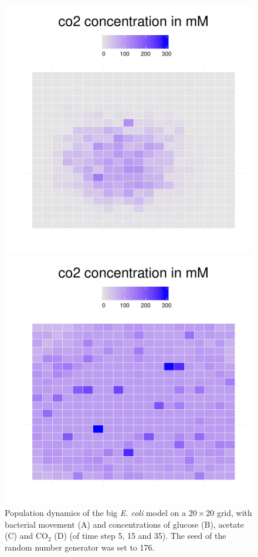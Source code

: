 \begin{figure}[h!]
{\begin{minipage}[t]{0.3\textwidth}
  \end{minipage}
  \begin{minipage}[t]{0.3\textwidth}
    \includegraphics[width=\textwidth]{../results/Bcoli_20x20_seed176_co215.pdf}
  \end{minipage}
  \begin{minipage}[t]{0.3\textwidth}
    \includegraphics[width=\textwidth]{../results/Bcoli_20x20_seed176_co235a.pdf}
  \end{minipage}
  }
  \caption{Population dynamics of the big \emph{E. coli} model on a $20\times20$ grid, with bacterial movement (A) and concentrations of glucose (B), acetate (C) and CO$_2$ (D) (of time step 5, 15 and 35). The seed of the random number generator was set to 176.}
  \label{fig:ecoligrids}
\end{figure}

